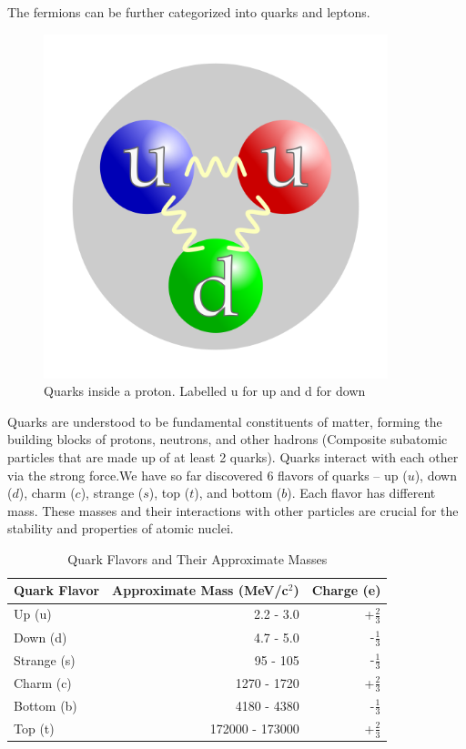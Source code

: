 The fermions can be further categorized into quarks and leptons.

\begin{figure}[H]
  \centering
  \includegraphics[width=100mm]{figures/protonQuarks.png}
  \caption{Quarks inside a proton.
    Labelled u for up and d for down}
  \label{protonQuarks}
\end{figure}

Quarks are understood to be fundamental constituents of matter, forming the building blocks of protons, neutrons, and other hadrons (Composite subatomic particles that are made up of at least 2 quarks).
Quarks interact with each other via the strong force.We have so far discovered 6 flavors of quarks -- up (\(u\)), down (\(d\)), charm (\(c\)), strange (\(s\)), top (\(t\)), and bottom (\(b\)).
Each flavor has different mass.
These masses and their interactions with other particles are crucial for the stability and properties of atomic nuclei.

\begin{table}[h!]
  \centering
  \begin{tabular}{lrr}
    \toprule
    Quark Flavor & Approximate Mass (MeV/c\(^2\)) & Charge (e) \\
    \midrule
    Up (u)      & 2.2 - 3.0        & +\(\frac{2}{3}\) \\
    Down (d)    & 4.7 - 5.0        & -\(\frac{1}{3}\) \\
    Strange (s) & 95 - 105         & -\(\frac{1}{3}\) \\
    Charm (c)   & 1270 - 1720      & +\(\frac{2}{3}\) \\
    Bottom (b)  & 4180 - 4380      & -\(\frac{1}{3}\) \\
    Top (t)     & 172000 - 173000  & +\(\frac{2}{3}\) \\
    \bottomrule
  \end{tabular}
  \caption{Quark Flavors and Their Approximate Masses}
  \label{quarkMass}
\end{table}

